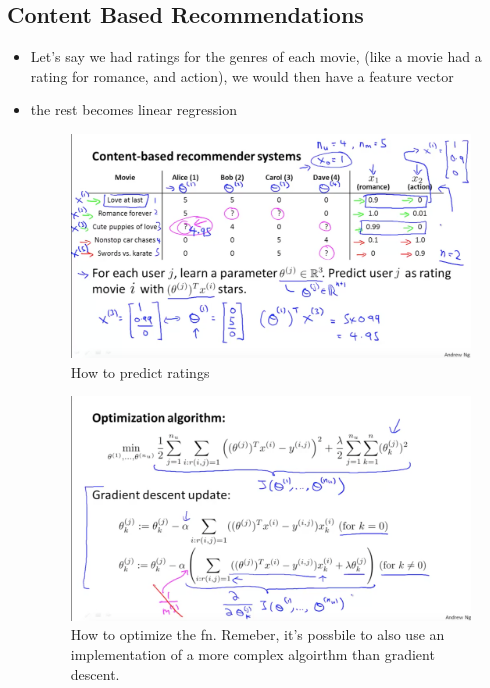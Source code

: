 \documentclass[]{article}
\begin{document}
	\subsection{Content Based Recommendations}
		\begin{itemize}
			\item Let's say we had ratings for the genres of each movie, (like a movie had a rating for romance, and action), we would then have a feature vector
			\item the rest becomes linear regression
			\begin{figure}[ht!]
				\includegraphics[width= 1.5\textwidth,center]{Content_Example.png}
				\caption{How to predict ratings}
			\end{figure}
			\begin{figure}[ht!]
				\includegraphics[width= 1.5\textwidth,center]{Optimization_For_Recommender.png}
				\caption{How to optimize the fn. Remeber, it's possbile to also use an implementation of a more complex algoirthm than gradient descent.}
			\end{figure}
		\end{itemize}
		
\end{document}
